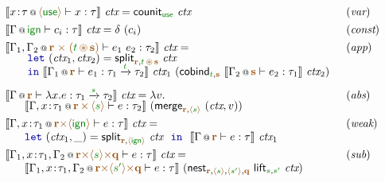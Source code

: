 \begin{figure*}[!t]
\begin{equation*}
\begin{array}{ll}
 \sem{\coctx{x\!:\!\tau}{\alift{\cunit}} \vdash x : \tau }~\ctx =
   \ident{counit}_{\cunit}~\ctx & (\emph{var})
\\[0.4em]
\sem{\coctx{\Gamma}{\czero} \vdash c_i : \tau }~\ctx =
  \delta~(c_i) & (\emph{const})
\\[0.4em]
\sem{\coctx{\Gamma_1, \Gamma_2}{\aclrd{\textbf{r}\;\atimes\;(\cclrd{t} \,\aseq\, \aclrd{\textbf{s}})}} \vdash e_1~e_2 : \tau_2}~\ctx = & (\emph{app})\\[-0.25em]
  \hspace{1.5em}
  \begin{array}{l}  
  \kvd{let}~(\ctx_1, \ctx_2) = \ident{split}_{\aclrd{\textbf{r}}, \cclrd{t} \,\aseq\, \aclrd{\textbf{s}}}~\ctx\\[-0.25em]
  \kvd{in}~\sem{\coctx{\Gamma_1}{\aclrd{\textbf{r}}} \vdash e_1 : \tau_1 \xrightarrow{\cclrd{t}} \tau_2}~\ctx_1~
      (\ident{cobind}_{\cclrd{t}, \aclrd{\textbf{s}}}~\sem{\coctx{\Gamma_2}{\aclrd{\textbf{s}}} \vdash e_2 : \tau_1 }~\ctx_2)
  \end{array}
\\[1.4em]
\sem{\coctx{\Gamma}{\aclrd{\textbf{r}}} \vdash \lambda x.e : \tau_1 \xrightarrow{\cclrd{s}} \tau_2 }~\ctx = \lambda v.& (\emph{abs})\\[-0.25em]
\hspace{1.75em}\sem{\coctx{\Gamma, x\!:\!\tau_1}{\aclrd{\textbf{r}}\,\atimes\,\alift{\cclrd{s}}} \vdash e : \tau_2}
  ~(\ident{merge}_{\aclrd{\textbf{r}}, \alift{\cclrd{s}}}~(\ctx, v))
\\[0.4em]
\sem{\coctx{\Gamma,x \!:\! \tau_1}{\aclrd{\textbf{r}} \atimes \alift{ \czero }} \vdash e : \tau}~\ctx = & (\emph{weak}) \\
  \hspace{1.75em}
  \kvd{let}~(\ctx_1, \_) = \ident{split}_{\aclrd{\textbf{r}}, \alift{\czero}}~\ctx~~\kvd{in}~~
  \sem{\coctx{\Gamma}{ \aclrd{\textbf{r}} } \vdash e : \tau}~\ctx_1
\\[0.4em]
\sem{\coctx{\Gamma_1,x\!:\!\tau_1,\Gamma_2}{\aclrd{\textbf{r}} \atimes \alift{\cclrd{s}} \atimes \aclrd{\textbf{q}}} \vdash e : \tau}~\ctx = & (\emph{sub})\\
  \hspace{1.75em}
  \sem{\coctx{\Gamma_1,x\!:\!\tau_1,\Gamma_2}{\aclrd{\textbf{r}} \atimes \alift{\cclrd{s'}} \atimes \aclrd{\textbf{q}}} \vdash e : \tau}~
  (\ident{nest}_{\aclrd{\textbf{r}}, \alift{\cclrd{s}}, \alift{\cclrd{s'}}, \aclrd{\textbf{q}}}~\ident{lift}_{\cclrd{s}, \cclrd{s'}}~\ctx)

\end{array}
\end{equation*}
\end{figure*}
